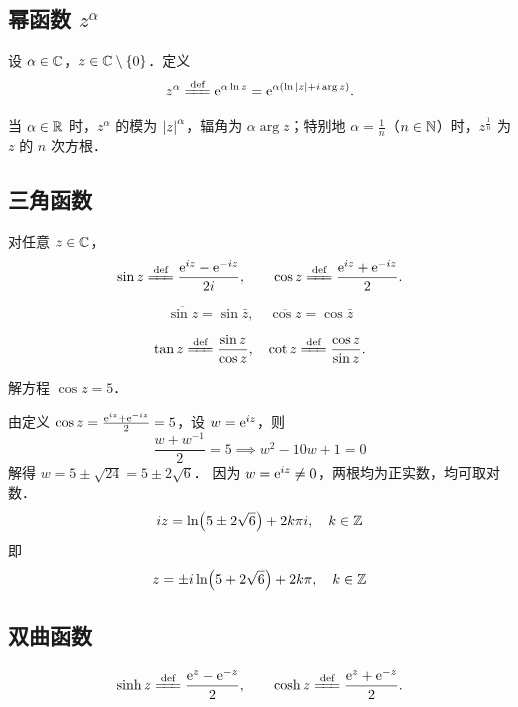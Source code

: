\documentclass[12pt, a4paper, oneside, UTF8]{ctexbook}
\begin{document}
\subsection{幂函数 $z^\alpha$}
\begin{definition}[一般幂函数]
设 $\alpha\in\mathbb{C}$，$z\in\mathbb{C}\setminus\{0\}$．定义
\[
z^\alpha \defeq \e^{\alpha\ln z} = \e^{\alpha(\ln\abs{z} + i\arg z)}.
\]
\end{definition}

\begin{theorem}[一般幂函数的性质]
当 $\alpha\in\mathbb{R}$ 时，$z^\alpha$ 的模为 $\abs{z}^\alpha$，辐角为 $\alpha\arg z$；特别地 $\alpha=\frac{1}{n}$（$n\in\mathbb{N}$）时，$z^{\frac{1}{n}}$ 为 $z$ 的 $n$ 次方根．
\end{theorem}

\subsection{三角函数}
\begin{definition}[正弦与余弦]
对任意 $z\in\mathbb{C}$，
\[
\sin z \defeq \frac{\e^{iz} - \e^{-iz}}{2i},\qquad
\cos z \defeq \frac{\e^{iz} + \e^{-iz}}{2}.
\]
\end{definition}

\begin{theorem}[三角函数的性质]

$$\overline{\sin z} = \sin \bar{z},\quad \overline{\cos z}=\cos\bar z$$

\end{theorem}

\begin{definition}[正切与余切]
\[
\tan z \defeq \frac{\sin z}{\cos z},\quad \cot z \defeq \frac{\cos z}{\sin z}.
\]
\end{definition}

\begin{example}
    解方程 $\cos z = 5$．
\end{example}
\begin{solution}
    由定义 $\cos z = \frac{\mathrm{e}^{iz} + \mathrm{e}^{-iz}}{2} = 5$，设 $w = \mathrm{e}^{iz}$，则
    \[
    \frac{w + w^{-1}}{2} = 5 \implies w^2 - 10w + 1 = 0
    \]
    解得 $w = 5 \pm \sqrt{24} = 5 \pm 2\sqrt{6}$．
    因为 $w = \mathrm{e}^{iz} \neq 0$，两根均为正实数，均可取对数．
    \[
    iz = \ln(5 \pm 2\sqrt{6}) + 2k\pi i,\quad k\in\mathbb{Z}
    \]
    即
    \[
    z = \pm i\ln(5 + 2\sqrt{6}) + 2k\pi,\quad k\in\mathbb{Z}
    \]
\end{solution}

\subsection{双曲函数}
\begin{definition}[双曲正弦与余弦]
\[
\sinh z \defeq \frac{\e^z - \e^{-z}}{2},\qquad
\cosh z \defeq \frac{\e^z + \e^{-z}}{2}.
\]
\end{definition}
\end{document}
